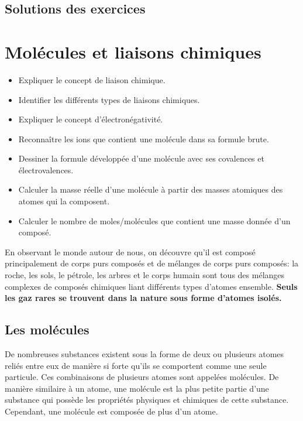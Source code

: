\documentclass[
  11pt,
  french,
  a4paper,
  openany]{book}
\providecommand{\tightlist}{%
  \setlength{\itemsep}{0pt}\setlength{\parskip}{0pt}}
\begin{document}
\newpage

\section{Solutions des exercices} \shipoutAnswer

\hypertarget{moluxe9cules-et-liaisons-chimiques}{%
\chapter{Molécules et liaisons chimiques}\label{moluxe9cules-et-liaisons-chimiques}}

\begin{objectives}

\begin{itemize}
\tightlist
\item
  Expliquer le concept de liaison chimique.
\item
  Identifier les différents types de liaisons chimiques.
\item
  Expliquer le concept d'électronégativité.
\item
  Reconnaître les ions que contient une molécule dans sa formule brute.
\item
  Dessiner la formule développée d'une molécule avec ses covalences et électrovalences.
\item
  Calculer la masse réelle d'une molécule à partir des masses atomiques des atomes qui la composent.
\item
  Calculer le nombre de moles/molécules que contient une masse donnée d'un composé.
\end{itemize}


\end{objectives}

En observant le monde autour de nous, on découvre qu'il est composé principalement de corps purs composés et de mélanges de corps purs composés: la roche, les sols, le pétrole, les arbres et le corps humain sont tous des mélanges complexes de composés chimiques liant différents types d'atomes ensemble. \textbf{Seuls les gaz rares se trouvent dans la nature sous forme d'atomes isolés.}

\hypertarget{les-moluxe9cules}{%
\section{Les molécules}\label{les-moluxe9cules}}

De nombreuses substances existent sous la forme de deux ou plusieurs atomes reliés entre eux de manière si forte qu'ils se comportent comme une seule particule. Ces combinaisons de plusieurs atomes sont appelées molécules. De manière similaire à un atome, une molécule est la plus petite partie d'une substance qui possède les propriétés physiques et chimiques de cette substance. Cependant, une molécule est composée de plus d'un atome.
\end{document}
